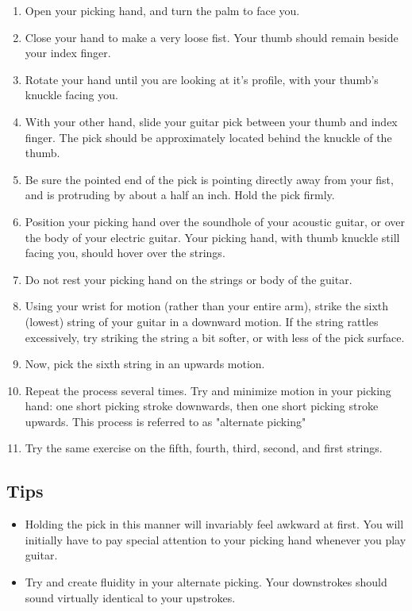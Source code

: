 \begin{enumerate}
\item Open your picking hand, and turn the palm to face you.
\item Close your hand to make a very loose fist. Your thumb should remain beside your index finger.
\item Rotate your hand until you are looking at it's profile, with your thumb's knuckle facing you.
\item With your other hand, slide your guitar pick between your thumb and index finger. The pick should be approximately located behind the knuckle of the thumb.
\item Be sure the pointed end of the pick is pointing directly away from your fist, and is protruding by about a half an inch. Hold the pick firmly.
\item Position your picking hand over the soundhole of your acoustic guitar, or over the body of your electric guitar. Your picking hand, with thumb knuckle still facing you, should hover over the strings.
\item Do not rest your picking hand on the strings or body of the guitar.
\item Using your wrist for motion (rather than your entire arm), strike the sixth (lowest) string of your guitar in a downward motion. If the string rattles excessively, try striking the string a bit softer, or with less of the pick surface.
\item Now, pick the sixth string in an upwards motion.
\item Repeat the process several times. Try and minimize motion in your picking hand: one short picking stroke downwards, then one short picking stroke upwards. This process is referred to as "alternate picking"
\item Try the same exercise on the fifth, fourth, third, second, and first strings.
\end{enumerate}
%
\subsection{Tips}
\begin{itemize}
\item Holding the pick in this manner will invariably feel awkward at first. You will initially have to pay special attention to your picking hand whenever you play guitar.
\item Try and create fluidity in your alternate picking. Your downstrokes should sound virtually identical to your upstrokes.
\end{itemize}

